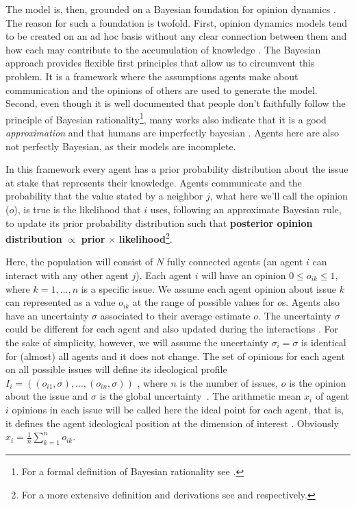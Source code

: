 \documentclass{article}
\begin{document}
The model is, then, grounded on a Bayesian foundation for opinion dynamics
\cite{martins12b}. The reason for such a foundation is twofold. First, opinion
dynamics models tend to be created on an ad hoc basis without any clear
connection between them and how each may contribute to the accumulation of
knowledge \cite{flache2017}. The Bayesian approach provides flexible first
principles that allow us to circumvent this problem. It is a framework where the
assumptions agents make about communication and the opinions of others are used
to generate the model. Second, even though it is well documented that people
don't faithfully follow the principle of Bayesian rationality\footnote{For a
  formal definition of Bayesian rationality see
  \cite[p.104]{gintis2016individuality}.}, many works also indicate that it is a
good \textit{approximation} and that humans are imperfectly bayesian
\cite{tenenbaumetal07,kempetal10a, teglasetal11a, martins05b,
  gintis2016individuality, baker2017rational}. Agents here are also not
perfectly Bayesian, as their models are incomplete.

In this framework every agent has
a prior probability distribution about the issue at stake that represents their
knowledge. Agents communicate and the probability that the value stated by a
neighbor $j$, what here we'll call the opinion (\(o\)), is true is the
likelihood that $i$ uses, following an approximate Bayesian rule, to update its
prior probability distribution such that \textbf{posterior opinion distribution}
$\propto$ \textbf{prior} $\times$ \textbf{likelihood}\footnote{For a more
  extensive definition and derivations see \cite{martins12b} and
  \cite{martins2009bayesian} respectively.}.

Here, the population will consist of \(N\) fully connected agents (an agent $i$
can interact with any other agent $j$). Each agent $i$ will have an opinion
$0\leq o_{ik} \leq 1$, where $k=1, \ldots, n$ is a specific issue. We assume
each agent opinion about issue $k$ can represented as a value $o_{ik}$ at the
range of possible values for $o$s. Agents also have an uncertainty $\sigma$
associated to their average estimate $o$. The uncertainty $\sigma$ could be
different for each agent and also updated during the interactions
\cite{martins08c}. For the sake of simplicity, however, we will assume the
uncertainty $\sigma_i =\sigma$ is identical for (almost) all agents and it does
not change. The set of opinions for each agent on all possible issues will
define its ideological profile \(I_i = ( (o_{i 1}, \sigma), \ldots, (o_{i n},
\sigma) ) \) , where \(n\) is the number of issues, \(o\) is the opinion about
the issue and \(\sigma\) is the global uncertainty~\cite{martins2009bayesian}.
The arithmetic mean $x_i$ of agent $i$ opinions in each issue will be called
here the ideal point for each agent, that is, it defines the agent ideological
position at the dimension of interest \cite{armstrong2014analyzing}. Obviously
\( x_i = \frac{1}{n} \sum_{k=1}^{n} o_{ik} \).
\end{document}
